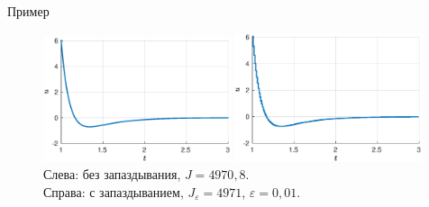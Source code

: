         \begin{frame}{Пример}
                \begin{figure}[t]        
                        \hfill
                        \includegraphics[width=0.49\textwidth]{content/example/simple-control.eps}
                        \hfill
                        \includegraphics[width=0.49\textwidth]{content/example/small-control.eps}
                        \hfill
                        Слева: без запаздывания, $J = 4970,\!8$.\\
                        Справа: с запаздыванием, $J_{\varepsilon} = 4971$, $\varepsilon = 0,\!01$.
                \end{figure}
        \end{frame}

